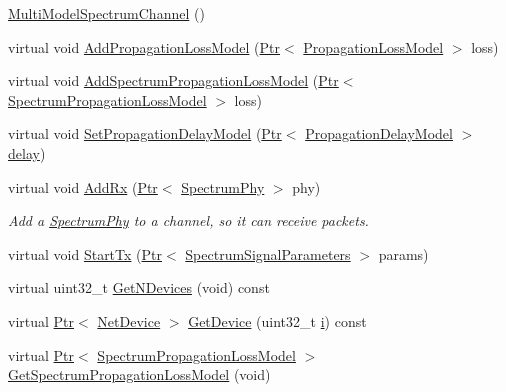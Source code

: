 \begin{DoxyCompactItemize}
\item 
\hyperlink{classns3_1_1MultiModelSpectrumChannel_ac52d8c29e59462d9c2572f473d149b38}{Multi\+Model\+Spectrum\+Channel} ()
\item 
virtual void \hyperlink{classns3_1_1MultiModelSpectrumChannel_ae458452bac17bd605b6e2f8f0fd58b29}{Add\+Propagation\+Loss\+Model} (\hyperlink{classns3_1_1Ptr}{Ptr}$<$ \hyperlink{classns3_1_1PropagationLossModel}{Propagation\+Loss\+Model} $>$ loss)
\item 
virtual void \hyperlink{classns3_1_1MultiModelSpectrumChannel_ab21aa703ae43c5513de3103e2ff7991b}{Add\+Spectrum\+Propagation\+Loss\+Model} (\hyperlink{classns3_1_1Ptr}{Ptr}$<$ \hyperlink{classns3_1_1SpectrumPropagationLossModel}{Spectrum\+Propagation\+Loss\+Model} $>$ loss)
\item 
virtual void \hyperlink{classns3_1_1MultiModelSpectrumChannel_a4c084f8ebc99293951fd8f4f6b503cef}{Set\+Propagation\+Delay\+Model} (\hyperlink{classns3_1_1Ptr}{Ptr}$<$ \hyperlink{classns3_1_1PropagationDelayModel}{Propagation\+Delay\+Model} $>$ \hyperlink{mmwave_2model_2fading-traces_2fading__trace__generator_8m_a7964e6aa8f61a9d28973c8267a606ad8}{delay})
\item 
virtual void \hyperlink{classns3_1_1MultiModelSpectrumChannel_af365f7a37625876a9e476e6eb6376f7e}{Add\+Rx} (\hyperlink{classns3_1_1Ptr}{Ptr}$<$ \hyperlink{classns3_1_1SpectrumPhy}{Spectrum\+Phy} $>$ phy)
\begin{DoxyCompactList}\small\item\em Add a \hyperlink{classns3_1_1SpectrumPhy}{Spectrum\+Phy} to a channel, so it can receive packets. \end{DoxyCompactList}\item 
virtual void \hyperlink{classns3_1_1MultiModelSpectrumChannel_ab5b8cfe54c081f858014b133d026ed26}{Start\+Tx} (\hyperlink{classns3_1_1Ptr}{Ptr}$<$ \hyperlink{structns3_1_1SpectrumSignalParameters}{Spectrum\+Signal\+Parameters} $>$ params)
\item 
virtual uint32\+\_\+t \hyperlink{classns3_1_1MultiModelSpectrumChannel_a7b9648e204e7c2ffb4d894c932c89301}{Get\+N\+Devices} (void) const 
\item 
virtual \hyperlink{classns3_1_1Ptr}{Ptr}$<$ \hyperlink{classns3_1_1NetDevice}{Net\+Device} $>$ \hyperlink{classns3_1_1MultiModelSpectrumChannel_a8115c43e8b9ea3c0d18f5ced4aac0dec}{Get\+Device} (uint32\+\_\+t \hyperlink{lte__uplink__power__control_8m_a6f6ccfcf58b31cb6412107d9d5281426}{i}) const 
\item 
virtual \hyperlink{classns3_1_1Ptr}{Ptr}$<$ \hyperlink{classns3_1_1SpectrumPropagationLossModel}{Spectrum\+Propagation\+Loss\+Model} $>$ \hyperlink{classns3_1_1MultiModelSpectrumChannel_aa793e23af98297357e53121f319a575f}{Get\+Spectrum\+Propagation\+Loss\+Model} (void)
\end{DoxyCompactItemize}
